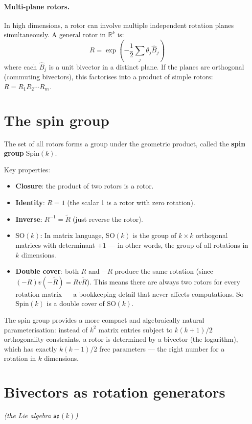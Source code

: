 \documentclass[11pt, twoside, openright]{memoir}
\newcommand{\rev}[1]{\widetilde{#1}} %
\numberwithin{equation}{chapter}
\begin{document}
\paragraph{Multi-plane rotors.}
In high dimensions, a rotor can involve multiple independent rotation
planes simultaneously.  A general rotor in $\mathbb{R}^k$ is:
\begin{equation}
  R = \exp\!\left(-\frac{1}{2}\sum_j \theta_j \hat{B}_j\right)
\end{equation}
where each $\hat{B}_j$ is a unit bivector in a distinct plane.
If the planes are orthogonal (commuting bivectors), this factorises
into a product of simple rotors:
$R = R_1 R_2 \cdots R_m$.

\section{The spin group}

The set of all rotors forms a group under the geometric product,
called the \textbf{spin group} $\mathrm{Spin}(k)$.

Key properties:
\begin{itemize}[nosep]
\item \textbf{Closure}: the product of two rotors is a rotor.
\item \textbf{Identity}: $R = 1$ (the scalar 1 is a rotor with zero rotation).
\item \textbf{Inverse}: $R^{-1} = \rev{R}$ (just reverse the rotor).
\item \textbf{$\mathrm{SO}(k)$}: In matrix language, $\mathrm{SO}(k)$ is the group of $k \times k$
  orthogonal matrices with determinant $+1$ --- in other words, the group of all rotations in $k$ dimensions.
\item \textbf{Double cover}: both $R$ and $-R$ produce the same rotation (since $(-R)v(-\widetilde{R}) = Rv\widetilde{R}$). This means there are always two rotors for every rotation matrix --- a bookkeeping detail that never affects computations. So $\mathrm{Spin}(k)$ is a
  double cover of $\mathrm{SO}(k)$.
\end{itemize}

The spin group provides a
more compact and algebraically natural parameterisation: instead of
$k^2$ matrix entries subject to $k(k+1)/2$ orthogonality constraints,
a rotor is determined by a bivector (the logarithm), which has exactly
$k(k-1)/2$ free parameters --- the right number for a rotation in $k$
dimensions.

\section{Bivectors as rotation generators}
\textit{(the Lie algebra $\mathfrak{so}(k)$)}
\end{document}
